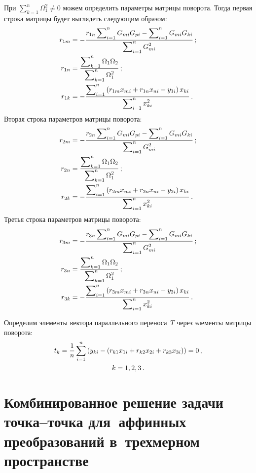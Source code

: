 \begin{multicols}{2}
  При $\sum\nolimits^n_{k=1} \Omega_1^2\not=0$ можем определить 
па\-ра\-мет\-ры мат\-ри\-цы поворота. Тогда первая строка мат\-ри\-цы будет выглядеть 
сле\-ду\-ющим образом:
  \begin{align*}
  r_{1{m}}& =-\displaystyle\frac{\displaystyle r_{1{n}}\sum\nolimits^n_{i=1} G_{mi} G_{pi} 
-\sum\nolimits^n_{i=1} G_{mi} G_{ki}\mathstrut}{\displaystyle \sum\nolimits^n_{i=1} G_{mi}^2\mathstrut}\,;\\ 
r_{1n} &=\displaystyle\frac{\displaystyle \sum\nolimits^n_{k=1} \Omega_1\Omega_2\mathstrut}{\displaystyle \sum\nolimits^n_{k=1} 
\Omega_1^2\mathstrut}\,;\\
  r_{1k} &=-\displaystyle\frac{\displaystyle \sum\nolimits^n_{i=1} \left( r_{1{m}} x_{{m}i} 
+r_{1{n}} x_{{n}i} -y_{1i}\right) x_{ki}\mathstrut}{\displaystyle \sum\nolimits^n_{i=1} 
x^2_{ki}\mathstrut}\,.
  \end{align*}
  Вторая строка параметров мат\-ри\-цы поворота:
  \begin{align*}
  r_{2{m}} &=-\displaystyle\frac{\displaystyle r_{2{n}}\sum\nolimits^n_{i=1} G_{mi} G_{pi} 
-\sum\nolimits^n_{i=1} G_{mi} G_{ki}\mathstrut}{\displaystyle \sum\nolimits^n_{i=1} G_{mi}^2\mathstrut}\,;\\ 
r_{2n} &=\displaystyle\frac{\displaystyle \sum\nolimits^n_{k=1} \Omega_1\Omega_2\mathstrut}{\displaystyle \sum\nolimits^n_{k=1} 
\Omega_1^2\mathstrut}\,;\\
  r_{2k} &=-\displaystyle\frac{\displaystyle \sum\nolimits^n_{i=1} \left( r_{2{m}} x_{{m}i} 
+r_{2{n}} x_{{n}i} -y_{2i}\right) x_{ki}\mathstrut}{\displaystyle \sum\nolimits^n_{i=1} 
x^2_{ki}\mathstrut}\,.
  \end{align*}
  Третья строка параметров мат\-ри\-цы поворота:
  \begin{align*}
  r_{3{m}}& =-\displaystyle\frac{\displaystyle r_{3{n}}\sum\nolimits^n_{i=1} G_{mi} G_{pi} 
-\sum\nolimits^n_{i=1} G_{mi} G_{ki}\mathstrut}{\displaystyle \sum\nolimits^n_{i=1} G_{mi}^2\mathstrut}\,;\\ 
r_{3n} &=\displaystyle\frac{\displaystyle \sum\nolimits^n_{k=1} \Omega_1\Omega_2\mathstrut}{\displaystyle \sum\nolimits^n_{k=1} 
\Omega_1^2\mathstrut}\,;\\
  r_{3k} &=-\displaystyle\frac{\displaystyle \sum\nolimits^n_{i=1} \left( r_{3{m}} x_{{m}i} 
+r_{3{n}} x_{{n}i} -y_{3i}\right) x_{ki}\mathstrut}{\displaystyle \sum\nolimits^n_{i=1} 
x^2_{ki}\mathstrut}\,.
  \end{align*}
  
  Определим элементы вектора параллельного переноса~$T$ через элементы 
мат\-ри\-цы поворота:
  \begin{multline*}
  t_k=\displaystyle\frac{\displaystyle 1\mathstrut}{\displaystyle n\mathstrut}\sum\limits^n_{i=1} \left( y_{ki}-\left( r_{k1}x_{1i} 
+r_{k2}x_{2i} +r_{k3} x_{3i}\right)\right)=0\,,\\
  k=1,2,3\,.
  \end{multline*}
  
  \vspace*{-6pt}

\section{Комбинированное решение задачи точка--точка 
для~аффинных преобразований в~трехмерном пространстве}


\end{multicols}
